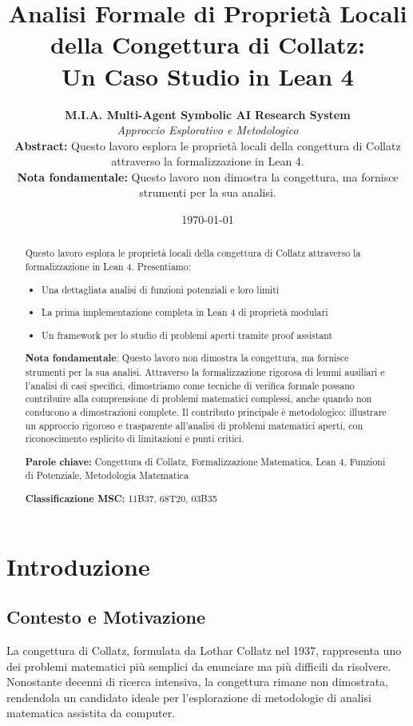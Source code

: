 \documentclass[11pt,a4paper]{article}
\title{\textbf{Analisi Formale di Proprietà Locali della Congettura di Collatz:\\
Un Caso Studio in Lean 4}}
\author{%
\textbf{M.I.A. Multi-Agent Symbolic AI Research System}\\
\textit{Approccio Esplorativo e Metodologico}\\
\vspace{0.5cm}
\textbf{Abstract:} Questo lavoro esplora le proprietà locali della congettura di Collatz attraverso la formalizzazione in Lean 4.\\
\textbf{Nota fondamentale:} Questo lavoro non dimostra la congettura, ma fornisce strumenti per la sua analisi.
}
\date{\today}
\begin{document}
\maketitle

\begin{abstract}
\noindent
Questo lavoro esplora le proprietà locali della congettura di Collatz attraverso la formalizzazione in Lean 4. Presentiamo:
\begin{itemize}
\item Una dettagliata analisi di funzioni potenziali e loro limiti
\item La prima implementazione completa in Lean 4 di proprietà modulari
\item Un framework per lo studio di problemi aperti tramite proof assistant
\end{itemize}
\textbf{Nota fondamentale}: Questo lavoro non dimostra la congettura, ma fornisce strumenti per la sua analisi. Attraverso la formalizzazione rigorosa di lemmi ausiliari e l'analisi di casi specifici, dimostriamo come tecniche di verifica formale possano contribuire alla comprensione di problemi matematici complessi, anche quando non conducono a dimostrazioni complete. Il contributo principale è metodologico: illustrare un approccio rigoroso e trasparente all'analisi di problemi matematici aperti, con riconoscimento esplicito di limitazioni e punti critici.

\textbf{Parole chiave:} Congettura di Collatz, Formalizzazione Matematica, Lean 4, Funzioni di Potenziale, Metodologia Matematica

\textbf{Classificazione MSC:} 11B37, 68T20, 03B35
\end{abstract}

\section{Introduzione}

\subsection{Contesto e Motivazione}

La congettura di Collatz, formulata da Lothar Collatz nel 1937, rappresenta uno dei problemi matematici più semplici da enunciare ma più difficili da risolvere. Nonostante decenni di ricerca intensiva, la congettura rimane non dimostrata, rendendola un candidato ideale per l'esplorazione di metodologie di analisi matematica assistita da computer.
\end{document}
